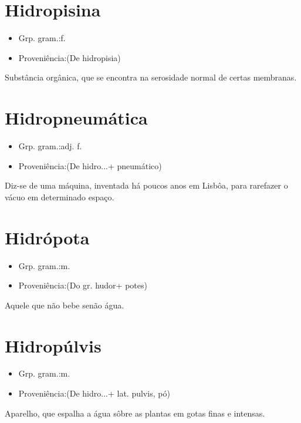 \documentclass{article}
\begin{document}
\section{Hidropisina}
\begin{itemize}
\item {Grp. gram.:f.}
\end{itemize}
\begin{itemize}
\item {Proveniência:(De \textunderscore hidropisia\textunderscore )}
\end{itemize}
Substância orgânica, que se encontra na serosidade normal de certas membranas.
\section{Hidropneumática}
\begin{itemize}
\item {Grp. gram.:adj. f.}
\end{itemize}
\begin{itemize}
\item {Proveniência:(De \textunderscore hidro...\textunderscore  + \textunderscore pneumático\textunderscore )}
\end{itemize}
Diz-se de uma máquina, inventada há poucos anos em Lisbôa, para rarefazer o vácuo em determinado espaço.
\section{Hidrópota}
\begin{itemize}
\item {Grp. gram.:m.}
\end{itemize}
\begin{itemize}
\item {Proveniência:(Do gr. \textunderscore hudor\textunderscore  + \textunderscore potes\textunderscore )}
\end{itemize}
Aquele que não bebe senão água.
\section{Hidropúlvis}
\begin{itemize}
\item {Grp. gram.:m.}
\end{itemize}
\begin{itemize}
\item {Proveniência:(De \textunderscore hidro...\textunderscore  + lat. \textunderscore pulvis\textunderscore , pó)}
\end{itemize}
Aparelho, que espalha a água sôbre as plantas em gotas finas e intensas.
\end{document}
